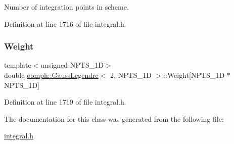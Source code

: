 Number of integration points in scheme. 



Definition at line 1716 of file integral.\+h.

\mbox{\label{classoomph_1_1GaussLegendre_3_012_00_01NPTS__1D_01_4_a4918e5aa95262b12f4c4767c63fa2c43}} 
\subsubsection{\texorpdfstring{Weight}{Weight}}
{\footnotesize\ttfamily template$<$unsigned N\+P\+T\+S\+\_\+1D$>$ \\
double \hyperlink{classoomph_1_1GaussLegendre}{oomph\+::\+Gauss\+Legendre}$<$ 2, N\+P\+T\+S\+\_\+1D $>$\+::Weight\mbox{[}N\+P\+T\+S\+\_\+1D $\ast$N\+P\+T\+S\+\_\+1D\mbox{]}\hspace{0.3cm}{\ttfamily [private]}}



Definition at line 1719 of file integral.\+h.



The documentation for this class was generated from the following file\+:\begin{DoxyCompactItemize}
\item 
\hyperlink{integral_8h}{integral.\+h}\end{DoxyCompactItemize}
